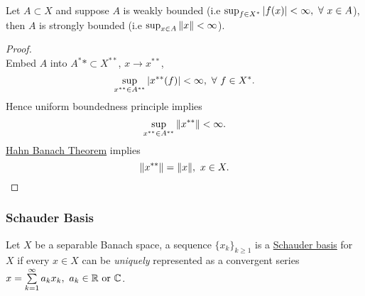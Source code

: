 \vspace{3pt}
\begin{corollary}\ \\
    Let $A \subset X$ and suppose $A$ is weakly bounded (i.e $\sup_{f \in X^*} \abs{f(x)} < \infty,\ \forall\ x \in A$), then $A$ is strongly bounded (i.e $\sup_{x \in A} \norm{x} < \infty$).
\end{corollary}
\begin{proof}\ \\
Embed $A$ into $A^** \subset X^{**}$, $x \to x^{**}$, 
\begin{equation*}
    \sup_{x^{**} \in A^{**}} \abs{x^{**} (f)} < \infty,\ \forall\ f \in X^*.
\end{equation*}
Hence uniform boundedness principle implies
\begin{equation*}
    \sup_{x^{**} \in A^{**}} \norm{x^{**}} < \infty.
\end{equation*}
\hyperref[HB thm]{Hahn Banach Theorem} implies
\begin{equation*}
    \norm{x^{**}} = \norm{x},\ x \in X.
\end{equation*}
\end{proof}


\subsubsection{Schauder Basis}

\begin{definition}
    Let $X$ be a separable Banach space, a sequence $\{x_k\}_{k \geq 1}$ is a \underline{Schauder basis} for $X$ if every $x \in X$ can be \textit{uniquely} represented as a convergent series $x = \sum\limits_{k=1}^{\infty} a_k x_k,\ a_k \in \mathbb{R} \text{ or } \mathbb{C}$.  
\end{definition}

